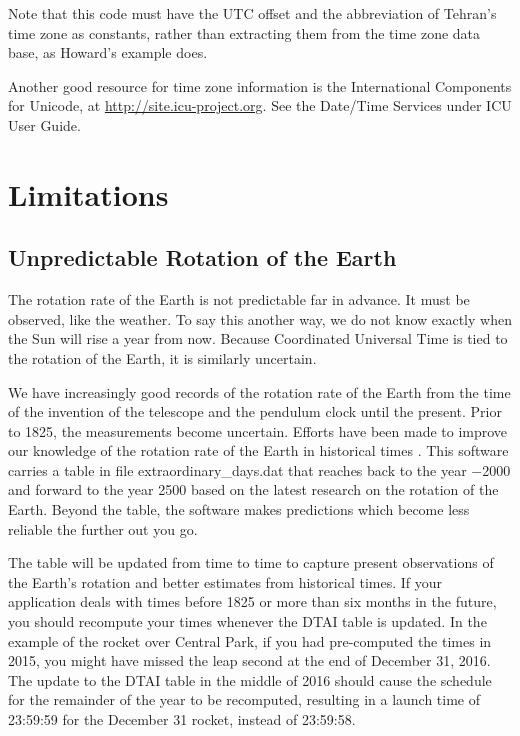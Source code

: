 \documentclass[letterpaper,twoside]{article}
\begin{document}
\inputminted[firstline=27,lastline=84]{Python}{examples/example_07.py}

Note that this code must have the UTC offset and the abbreviation
of Tehran's time zone as constants, rather than extracting them
from the time zone data base, as Howard's example does.

Another good resource for time zone information is
the International Components for Unicode, at
\url{http://site.icu-project.org}.
See the Date/Time Services under ICU User Guide.

\section{Limitations}
\subsection{Unpredictable Rotation of the Earth}
The rotation rate of the Earth is not predictable far in advance.  It must
be observed, like the weather.  To say this another way, we do not know
exactly when the Sun will rise a year from now.  Because Coordinated
Universal Time is tied to the rotation of the Earth, it is similarly
uncertain.

We have increasingly good records of the rotation rate of the Earth
from the time
of the invention of the telescope and the pendulum clock until
the present.  Prior to \num{1825}, the measurements become uncertain.
Efforts have been made to improve our knowledge of the rotation
rate of the Earth in historical times\citep{2004JHA....35..327M}%
\citep{2005JHA....36..339M}\citep{1997A&A...322..347S}%
\citep{2011ASSP...23....3S}\citep{1986PEPI...44..281M}%
\citep{Stephenson20160404}.
This software carries a table in file {\ttfamily extraordinary\_days.dat}
that reaches back to the year \num{-2000} and forward to
the year \num{2500} based on the latest research on the rotation
of the Earth.
Beyond the table, the software makes predictions which become less
reliable the further out you go.

The table will be updated from time to time to capture present
observations of the Earth's rotation and better estimates from
historical times.  If your application deals with times before
\num{1825} or more than six months in the future, you should recompute
your times whenever the DTAI table is updated.  In the example
of the rocket over Central Park, if you had pre-computed the times
in 2015, you might have missed the leap second at the end of
December 31, 2016.  The update to the DTAI table in the middle
of 2016 should cause the schedule for the remainder of the year
to be recomputed, resulting in a launch time of 23:59:59 for
the December 31 rocket, instead of 23:59:58.
\end{document}
